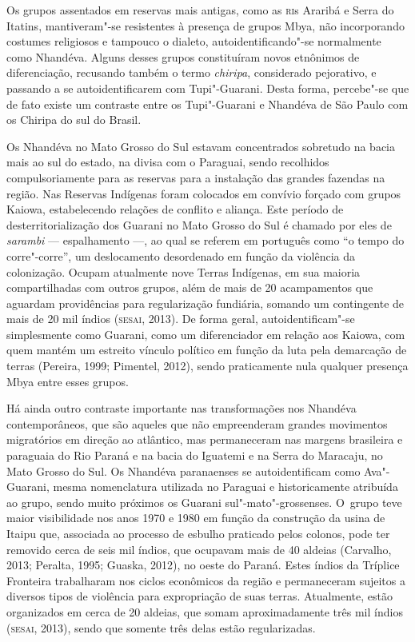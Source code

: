 Os grupos assentados em reservas mais antigas, como as \textsc{ri}s Araribá e
Serra do Itatins, mantiveram"-se resistentes à presença de grupos Mbya,
não incorporando costumes religiosos e tampouco o dialeto,
autoidentificando"-se normalmente como Nhandéva. Alguns desses grupos
constituíram novos etnônimos de diferenciação, recusando também o termo
\emph{chiripa}, considerado pejorativo, e passando a se autoidentificarem com
Tupi"-Guarani. Desta forma, percebe"-se que de fato existe um contraste
entre os Tupi"-Guarani e Nhandéva de São Paulo com os Chiripa do sul do
Brasil.

Os Nhandéva no Mato Grosso do Sul estavam concentrados sobretudo na
bacia mais ao sul do estado, na divisa com o Paraguai, sendo recolhidos
compulsoriamente para as reservas para a instalação das grandes
fazendas na região. Nas Reservas Indígenas foram colocados em convívio
forçado com grupos Kaiowa, estabelecendo relações de conflito e
aliança. Este período de desterritorialização dos Guarani no Mato
Grosso do Sul é chamado por eles de \emph{sarambi} --- espalhamento ---, ao qual
se referem em português como ``o tempo do corre"-corre'', um deslocamento
desordenado em função da violência da colonização. Ocupam atualmente
nove Terras Indígenas, em sua maioria compartilhadas com outros grupos,
além de mais de 20 acampamentos que aguardam providências para
regularização fundiária, somando um contingente de mais de 20 mil
índios (\textsc{sesai}, 2013). De forma geral, autoidentificam"-se simplesmente
como Guarani, como um diferenciador em relação aos Kaiowa, com quem
mantém um estreito vínculo político em função da luta pela demarcação
de terras (Pereira, 1999; Pimentel, 2012), sendo praticamente nula
qualquer presença Mbya entre esses grupos.

Há ainda outro contraste importante nas transformações nos Nhandéva
contemporâneos, que são aqueles que não empreenderam grandes movimentos
migratórios em direção ao atlântico, mas permaneceram nas margens
brasileira e paraguaia do Rio Paraná e na bacia do Iguatemi e na Serra
do Maracaju, no Mato Grosso do Sul. Os Nhandéva paranaenses se
autoidentificam como Ava"-Guarani, mesma nomenclatura utilizada no
Paraguai e historicamente atribuída ao grupo, sendo muito próximos os
Guarani sul"-mato"-grossenses. O~grupo teve maior visibilidade nos anos
1970 e 1980 em função da construção da usina de Itaipu que, associada
ao processo de esbulho praticado pelos colonos, pode ter removido cerca
de seis mil índios, que ocupavam mais de 40 aldeias (Carvalho, 2013;
Peralta, 1995; Guaska, 2012), no oeste do Paraná. Estes índios da
Tríplice Fronteira trabalharam nos ciclos econômicos da região e
permaneceram sujeitos a diversos tipos de violência para expropriação
de suas terras. Atualmente, estão organizados em cerca de 20 aldeias,
que somam aproximadamente três mil índios (\textsc{sesai}, 2013), sendo que
somente três delas estão regularizadas.

